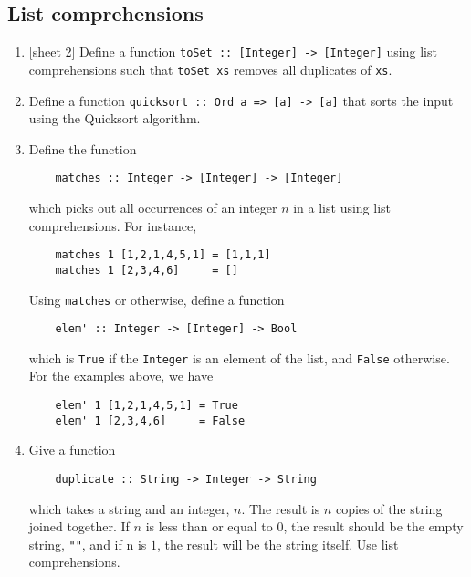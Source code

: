 \documentclass{article}
\begin{document}
\subsection{List comprehensions}
\begin{enumerate}
\item {[sheet 2]} Define a function \verb|toSet :: [Integer] -> [Integer]| using list comprehensions such that \verb|toSet xs| removes all duplicates of \verb|xs|.

\item Define a function \verb|quicksort :: Ord a => [a] -> [a]| that sorts the input using the Quicksort algorithm.

\item \cite[p. 115]{thompson} Define the function
\begin{verbatim}
    matches :: Integer -> [Integer] -> [Integer]
\end{verbatim}
which picks out all occurrences of an integer $n$ in a list using list comprehensions. For instance,
\begin{verbatim}
    matches 1 [1,2,1,4,5,1] = [1,1,1]
    matches 1 [2,3,4,6]     = []
\end{verbatim}
Using \verb|matches| or otherwise, define a function
\begin{verbatim}
    elem' :: Integer -> [Integer] -> Bool
\end{verbatim}
which is \verb|True| if the \verb|Integer| is an element of the list, and \verb|False| otherwise. For the examples above, we have
\begin{verbatim}
    elem' 1 [1,2,1,4,5,1] = True
    elem' 1 [2,3,4,6]     = False
\end{verbatim}

\item \cite[p. 115]{thompson} Give a function
\begin{verbatim}
    duplicate :: String -> Integer -> String
\end{verbatim}
which takes a string and an integer, $n$. The result is $n$ copies of the string joined together. If $n$ is less than or equal to $0$, the result should be the empty string, \verb|""|, and if n is $1$, the result will be the string itself. Use list comprehensions.
\end{enumerate}
\end{document}

